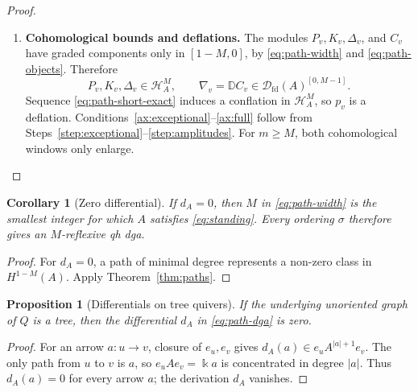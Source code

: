 \documentclass[11pt,a4paper]{article}
\newcommand{\D}{\mathcal D}
\renewcommand{\H}{\mathcal H}
\newcommand{\op}{\mathrm{op}}
\newcommand{\RR}{\mathbf{R}}
\newcommand{\std}{\Delta}
\newcommand{\costd}{\nabla}
\newcommand{\dual}{\mathbb D}
\DeclareMathOperator{\fd}{fd}
\DeclareMathOperator{\Hom}{Hom}
\DeclareMathOperator{\RHom}{\RR Hom}
\DeclareMathOperator{\thick}{thick}
\theoremstyle{plain}
\newtheorem{proposition}[theorem]{Proposition}
\newtheorem{corollary}[theorem]{Corollary}
\theoremstyle{definition}
\numberwithin{equation}{section}
\begin{document}
\begin{proof}
\begin{enumerate}[label=\textbf{\arabic*.},ref=\arabic*]
If $v<_\sigma u$, both complexes in \eqref{eq:restriction} vanish.
If $u=v$, the source of \eqref{eq:restriction} is $\Bbbk$ in degree $0$
and its target is zero. Applying $\RHom_A(-,\costd_v)$ to
\eqref{eq:path-short-exact}, using the homotopical projectivity of
$P_u$ and $K_u$, proves \eqref{eq:pairing}.

To verify exceptionality of
$(\costd_{\sigma(n)},\ldots,\costd_{\sigma(1)})$,
apply Steps~\ref{step:kernels}--\ref{step:fullness} to the graded
opposite algebra $A^{\op}$.
The left dg modules $C_v=B_ve_v$ are the resulting standard objects.
Thus $(C_{\sigma(1)},\ldots,C_{\sigma(n)})$ is exceptional in
$\D_{\fd}(A^{\op})$. Finite-dimensional vector-space duality gives
\[
 \Hom_{\D_{\fd}(A)}(\costd_u,\costd_v[t])
 \cong
 \Hom_{\D_{\fd}(A^{\op})}(C_v,C_u[t]).
\]
The sequence $(\costd_{\sigma(n)},\ldots,\costd_{\sigma(1)})$
is therefore exceptional.
Equation~\eqref{eq:path-full} places every $\costd_v$ in
$\thick_{\D_{\fd}(A)}(\std_1,\ldots,\std_n)$.

\item\label{step:amplitudes}
\textbf{Cohomological bounds and deflations.}
The modules $P_v,K_v,\std_v$, and $C_v$ have graded components only in
$[1-M,0]$, by \eqref{eq:path-width} and \eqref{eq:path-objects}.
Therefore
\[
 P_v,K_v,\std_v\in\H_A^M,\qquad
 \costd_v=\dual C_v\in\D_{\fd}(A)^{[0,M-1]}.
\]
Sequence \eqref{eq:path-short-exact} induces a conflation in $\H_A^M$,
so $p_v$ is a deflation. Conditions~\ref{ax:exceptional}--\ref{ax:full}
follow from Steps~\ref{step:exceptional}--\ref{step:amplitudes}.
For $m\geq M$, both cohomological windows only enlarge.
\end{enumerate}
\end{proof}

\begin{corollary}[Zero differential]\label{cor:zero-differential}
If $d_A=0$, then $M$ in \eqref{eq:path-width} is the smallest integer
for which $A$ satisfies \eqref{eq:standing}. Every ordering $\sigma$
therefore gives an $M$-reflexive qh dga.
\end{corollary}
\begin{proof}
For $d_A=0$, a path of minimal degree represents a non-zero class in
$H^{1-M}(A)$. Apply Theorem~\ref{thm:paths}.
\end{proof}

\begin{proposition}[Differentials on tree quivers]\label{prop:trees}
If the underlying unoriented graph of $Q$ is a tree, then the
differential $d_A$ in \eqref{eq:path-dga} is zero.
\end{proposition}
\begin{proof}
For an arrow $a:u\to v$, closure of $e_u,e_v$ gives
$d_A(a)\in e_uA^{|a|+1}e_v$. The only path from $u$ to $v$ is $a$,
so $e_uAe_v=\Bbbk a$ is concentrated in degree $|a|$.
Thus $d_A(a)=0$ for every arrow $a$; the derivation $d_A$ vanishes.
\end{proof}
\end{document}
